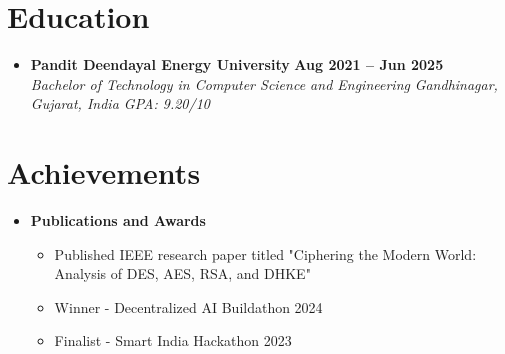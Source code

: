 \documentclass[letterpaper,10pt]{article}
\newcommand{\resumeItem}[1]{\item \small{#1}}
\newcommand{\resumeSubheading}[4]{
\item
\textbf{#1} \hfill \textbf{\small #2} \\
\textit{\small #3} \hfill \textit{\small #4}
\vspace{-4pt}
}
\newcommand{\resumeProjectHeading}[2]{
\item
\small #1 \hfill \textbf{\small #2}
\vspace{-4pt}
}
\begin{document}
\vspace{-6pt}
\section{Education}
\begin{itemize}[leftmargin=0in, label={}]
\resumeSubheading
{Pandit Deendayal Energy University}{Aug 2021 -- Jun 2025}
{Bachelor of Technology in Computer Science and Engineering}{Gandhinagar, Gujarat, India \quad GPA: 9.20/10}
\end{itemize}

\vspace{-6pt}
\section{Achievements}
\begin{itemize}[leftmargin=0in, label={}]
\resumeProjectHeading
{\textbf{Publications and Awards}}{}
\begin{itemize}
\resumeItem{Published IEEE research paper titled "Ciphering the Modern World: Analysis of DES, AES, RSA, and DHKE"}
\resumeItem{Winner - Decentralized AI Buildathon 2024}
\resumeItem{Finalist - Smart India Hackathon 2023}
\end{itemize}
\end{itemize}
\end{document}
